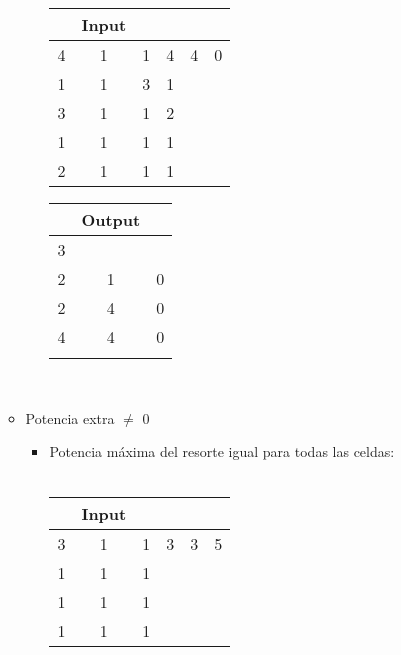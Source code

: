 \documentclass[11pt, a4paper, twoside]{article}
\begin{document}
\begin{itemize}
\begin{itemize}
\begin{itemize}
					\begin{minipage}{0.4\textwidth}
							\begin{tabular}{cccccc}
							 & Input \\
							   \hline
							   4 & 1 & 1 & 4 & 4 & 0\\
							   1 & 1 & 3 & 1 &   &  \\
							   3 & 1 & 1 & 2 &   &  \\
							   1 & 1 & 1 & 1 &   &  \\
							   2 & 1 & 1 & 1 &   &  \\
							\end{tabular}
						\end{minipage} 
							\begin{minipage}{0.3\textwidth}
								\begin{tabular}{ccc}
								  & Output \\
								   \hline
								   3 &   &   \\
								   2 & 1 & 0 \\
								   2 & 4 & 0 \\
								   4 & 4 & 0 \\
								    \\
							\end{tabular}
					\end{minipage} 	\\
			\end{itemize} 
		\item Potencia extra $\ne$ 0 \\
			\begin{itemize}
				\item Potencia m\'axima del resorte igual para todas las celdas:\\
				\\
					\begin{minipage}{0.4\textwidth}
							\begin{tabular}{cccccc}
							 & Input \\
							   \hline
							   3 & 1 & 1 & 3 & 3 & 5\\
							   1 & 1 & 1 &   &   &  \\
							   1 & 1 & 1 &   &   &  \\
							   1 & 1 & 1 &   &   &  \\
							\end{tabular}
						\end{minipage} 
						\begin{minipage}{0.3\textwidth}
							\begin{tabular}{ccc}

\end{tabular}
\end{minipage}
\end{itemize}
\end{itemize}
\end{itemize}
\end{document}
